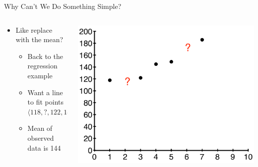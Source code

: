 \documentclass[aspectratio=169]{beamer}
\begin{document}
\begin{frame}{Why Can't We Do Something Simple?}

\begin{columns}[T]
\begin{column}{0.5\textwidth}
\begin{itemize}
\item Like replace with the mean?
\begin{itemize}
	\item Back to the regression example
	\item Want a line to fit points $\langle 118, ?, 122, 145, 149, ?, 186 \rangle$
	\item Mean of observed data is 144
\end{itemize}
\end{itemize}
\end{column}
\begin{column}{0.5\textwidth}
\includegraphics[width=1\textwidth]{lectEM/missingData1.pdf}
\end{column}
\end{columns}
\end{frame}
\end{document}
